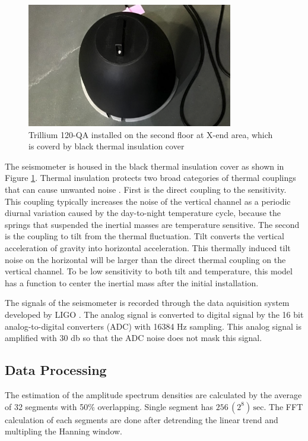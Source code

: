 \begin{figure}[h]
  \begin{center}   
    \includegraphics[width=9.0cm]{./img_chap3/img316.png}
    \caption{Trillium 120-QA installed on the second floor at X-end area, which is coverd by black thermal insulation cover}\label{img:img316}
  \end{center}
\end{figure}

The seismometer is housed in the black thermal insulation cover as shown in Figure \ref{img:img316}. Thermal insulation protects two broad categories of thermal couplings that can cause unwanted noise \cite{trillium120manual}. First is the direct coupling to the sensitivity. This coupling typically increases the noise of the vertical channel as a periodic diurnal variation caused by the day-to-night temperature cycle, because the springs that suspended the inertial masses are temperature sensitive. The second is the coupling to tilt from the thermal fluctuation. Tilt converts the vertical acceleration of gravity into horizontal acceleration. This thermally induced tilt noise on the horizontal will be larger than the direct thermal coupling on the vertical channel. To be low sensitivity to both tilt and temperature, this model has a function to center the inertial mass after the initial installation.

The signals of the seismometer is recorded through the data aquisition system developed by LIGO \cite{bork2001overview}. The analog signal is converted to digital signal by the 16 bit analog-to-digital converters (ADC) with 16384 $\mathrm{Hz}$ sampling. This analog signal is amplified with 30 db so that the ADC noise does not mask this signal. 

\subsection{Data Processing}
The estimation of the amplitude spectrum densities are calculated by the average of 32 segments with 50\% overlapping. Single segment has $256\, (2^8)\,\mathrm{sec}$. The FFT calculation of each segments are done after detrending the linear trend and multipling the Hanning window. 

